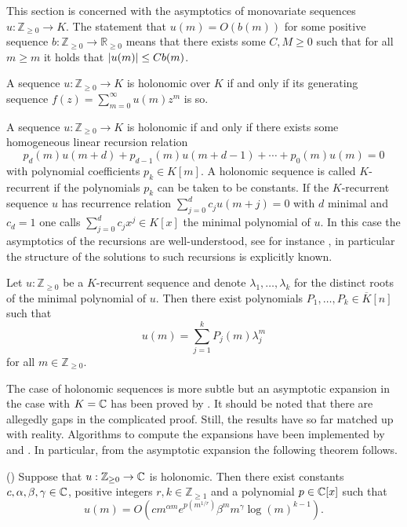     This section is concerned with the asymptotics of monovariate sequences $u:\mathbb{Z}_{\geq 0}\to K$.
    The statement that $u(m) = O(b(m))$ for some positive sequence $b:\mathbb{Z}_{\geq 0}\to \mathbb{R}_{\geq 0}$ means that there exists some $C,M\geq 0$ such that for all $m\geq m$ it holds that $\vert u(m) \vert\leq Cb(m)$.
    \begin{theorem}{\cite[Theorem 1.5]{stanley1980differentiably}}\label{thm: GeneratingFunction}
      A sequence $u:\mathbb{Z}_{\geq 0}\to K$ is holonomic over $K$ if and only if its generating sequence $f(z) = \sum_{m=0}^{\infty} u(m)z^m$ is so.
    \end{theorem}
    A sequence $u:\mathbb{Z}_{\geq 0}\to K$ is holonomic if and only if there exists some homogeneous linear recursion relation
    $$p_d(m)u(m+d) + p_{d-1}(m)u(m+d-1) + \cdots + p_0(m)u(m) = 0 $$
    with polynomial coefficients $p_k \in K[m]$.
    A holonomic sequence is called $K$-recurrent if the polynomials $p_k$ can be taken to be constants.
    If the $K$-recurrent sequence $u$ has recurrence relation $\sum_{j=0}^d c_{j}u(m+j)= 0$ with $d$ minimal and $c_d = 1$ one calls $\sum_{j=0}^d c_jx^j\in K[x]$ the minimal polynomial of $u$.
    In this case the asymptotics of the recursions are well-understood, see for instance \cite[Chapter 2]{everest2003recurrence}, in particular the structure of the solutions to such recursions is explicitly known.
    \begin{theorem}{\cite[Theorem 1.6]{nobleAsymptotics}}
      Let $u:\mathbb{Z}_{\geq 0}$ be a $K$-recurrent sequence and denote $\lambda_1,\ldots,\lambda_k$ for the distinct roots of the minimal polynomial of $u$.
      Then there exist polynomials $P_1,\ldots,P_k \in \overline{K}[n]$ such that
      $$u(m) = \sum_{j=1}^k P_j(m)\lambda_j^m$$
      for all $m\in \mathbb{Z}_{\geq 0}$.
    \end{theorem}
    The case of holonomic sequences is more subtle but an asymptotic expansion in the case with $K = \mathbb{C}$ has been proved by \cite{birkhoff1933analytic}.
    It should be noted that there are allegedly gaps in the complicated proof.
    Still, the results have so far matched up with reality.
    Algorithms to compute the expansions have been implemented by \cite{kauers2011mathematica} and \cite{zeilberger1990holonomic}.
    In particular, from the asymptotic expansion the following theorem follows.
    \begin{theorem}(\cite{birkhoff1933analytic})
      Suppose that $u:\mathbb{Z}_{\geq 0}\to \mathbb{C}$ is holonomic. Then there exist constants $c,\alpha, \beta, \gamma \in \mathbb{C}$, positive integers $r,k\in \mathbb{Z}_{\geq 1}$ and a polynomial $p\in \mathbb{C}[x]$ such that
      $$u(m) = O\left(cm^{\alpha m} e^{p(m^{1/r})}\beta^m m^\gamma \log(m)^{k-1}\right).$$
    \end{theorem}
